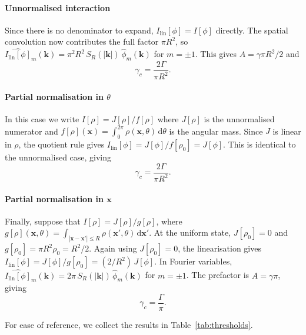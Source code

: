 \documentclass[a4paper,11pt]{article}
\theoremstyle{plain}
\theoremstyle{definition}
\theoremstyle{remark}
\newcommand{\dd}{\,\mathrm{d}}
\newcommand{\bx}{\mathbf{x}}
\newcommand{\bk}{\mathbf{k}}
\begin{document}
\paragraph{Unnormalised interaction}

Since there is no denominator to expand, $I_{\mathrm{lin}}[\phi] = I[\phi]$ directly. The spatial convolution now contributes the full factor $\pi R^2$, so $\widehat{I_{\mathrm{lin}}[\phi]}_m(\bk) = \pi^2 R^2\, S_R(|\bk|)\,\hat\phi_m(\bk)$ for $m = \pm 1$. This gives $A = \gamma\pi R^2/2$ and
\begin{equation*}\label{eq:gc-unnormalised}
    \gamma_c = \frac{2\Gamma}{\pi R^2}.
\end{equation*}

\paragraph{Partial normalisation in $\theta$}

In this case we write $I[\rho] = J[\rho]/f[\rho]$ where $J[\rho]$ is the unnormalised numerator and $f[\rho](\bx) = \int_0^{2\pi}\rho(\bx,\theta)\dd\theta$ is the angular mass. Since $J$ is linear in $\rho$, the quotient rule gives $I_{\mathrm{lin}}[\phi] = J[\phi]/f[\rho_0] = J[\phi]$. This is identical to the unnormalised case, giving
\begin{equation*}\label{eq:gc-theta-norm}
    \gamma_c = \frac{2\Gamma}{\pi R^2}.
\end{equation*}

\paragraph{Partial normalisation in $\bx$}

Finally, suppose that $I[\rho] = J[\rho]/g[\rho]$, where $g[\rho](\bx,\theta) = \int_{|\bx-\bx'|\leq R}\rho(\bx',\theta)\dd\bx'$. At the uniform state, $J[\rho_0] = 0$ and $g[\rho_0] = \pi R^2 \rho_0 = R^2/2$. Again using $J[\rho_0] = 0$, the linearisation gives $I_{\mathrm{lin}}[\phi] = J[\phi]/g[\rho_0] = (2/R^2)\,J[\phi]$. In Fourier variables, $\widehat{I_{\mathrm{lin}}[\phi]}_m(\bk) = 2\pi\, S_R(|\bk|)\,\hat\phi_m(\bk)$ for $m = \pm 1$.
The prefactor is $A = \gamma\pi$, giving
\begin{equation*}\label{eq:gc-x-norm}
    \gamma_c = \frac{\Gamma}{\pi}.
\end{equation*}

\medskip

For ease of reference, we collect the results in Table~\ref{tab:thresholds}.
\end{document}
